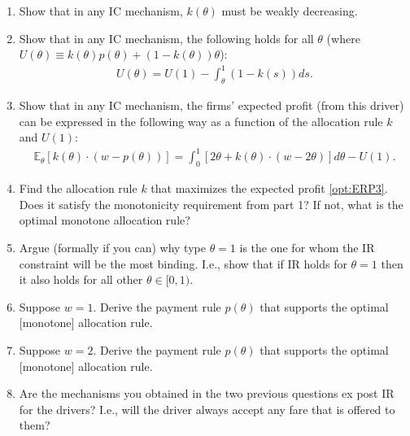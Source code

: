 \documentclass[a4paper]{article}
\newif\ifsolutions
\begin{document}

\begin{enumerate}
	\item Show that in any IC mechanism, $k(\theta)$ must be weakly decreasing.
	\item Show that in any IC mechanism, the following holds for all $\theta$ (where $U(\theta) \equiv k(\theta) p(\theta) + (1-k(\theta)) \theta$):
	\begin{align}
		\label{opt:ERP2}
		U(\theta) = U(1) - \int_{\theta}^{1} (1-k(s)) ds.
	\end{align}
	\item Show that in any IC mechanism, the firms' expected profit (from this driver) can be expressed in the following way as a function of the allocation rule $k$ and $U(1)$:
	\begin{align}
		\label{opt:ERP3}
		\mathbb{E}_\theta [k(\theta)\cdot (w-p(\theta))] = \int_0^1 \left[ 2\theta + k(\theta) \cdot (w - 2\theta ) \right] d\theta - U(1).
	\end{align}
	\item Find the allocation rule $k$ that maximizes the expected profit \eqref{opt:ERP3}. Does it satisfy the monotonicity requirement from part 1? If not, what is the optimal monotone allocation rule?
	\item Argue (formally if you can) why type $\theta=1$ is the one for whom the IR constraint will be the most binding. I.e., show that if IR holds for $\theta=1$ then it also holds for all other $\theta \in [0,1)$.
	\item Suppose $w=1$. Derive the payment rule $p(\theta)$ that supports the optimal [monotone] allocation rule.
	\item Suppose $w=2$. Derive the payment rule $p(\theta)$ that supports the optimal [monotone] allocation rule.
	\item Are the mechanisms you obtained in the two previous questions ex post IR for the drivers? I.e., will the driver always accept any fare that is offered to them?
\end{enumerate}


\ifsolutions
\end{document}
